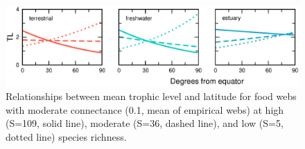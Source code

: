 \documentclass[12pt]{article}
\begin{document}
\begin{figure}[!h]
\label{TL_all}
\includegraphics[width=.9\textwidth]{Figures/TL_all.eps}
\caption{Relationships between mean trophic level and latitude for food webs with moderate connectance (0.1, mean of empirical webs) at high (S=109, solid line), moderate (S=36, dashed line), and low (S=5, dotted line) species richness.}
\end{figure}
\end{document}
